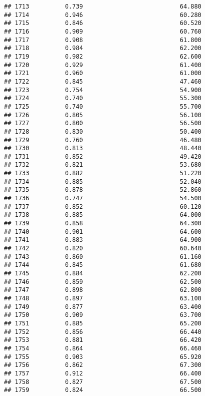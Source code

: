 \documentclass[
]{article}
\begin{document}
\begin{verbatim}
## 1713          0.739                           64.880
## 1714          0.946                           60.280
## 1715          0.846                           60.520
## 1716          0.909                           60.760
## 1717          0.908                           61.800
## 1718          0.984                           62.200
## 1719          0.982                           62.600
## 1720          0.929                           61.400
## 1721          0.960                           61.000
## 1722          0.845                           47.460
## 1723          0.754                           54.900
## 1724          0.740                           55.300
## 1725          0.740                           55.700
## 1726          0.805                           56.100
## 1727          0.800                           56.500
## 1728          0.830                           50.400
## 1729          0.760                           46.480
## 1730          0.813                           48.440
## 1731          0.852                           49.420
## 1732          0.821                           53.680
## 1733          0.882                           51.220
## 1734          0.885                           52.040
## 1735          0.878                           52.860
## 1736          0.747                           54.500
## 1737          0.852                           60.120
## 1738          0.885                           64.000
## 1739          0.858                           64.300
## 1740          0.901                           64.600
## 1741          0.883                           64.900
## 1742          0.820                           60.640
## 1743          0.860                           61.160
## 1744          0.845                           61.680
## 1745          0.884                           62.200
## 1746          0.859                           62.500
## 1747          0.898                           62.800
## 1748          0.897                           63.100
## 1749          0.877                           63.400
## 1750          0.909                           63.700
## 1751          0.885                           65.200
## 1752          0.856                           66.440
## 1753          0.881                           66.420
## 1754          0.864                           66.460
## 1755          0.903                           65.920
## 1756          0.862                           67.300
## 1757          0.912                           66.400
## 1758          0.827                           67.500
## 1759          0.824                           66.500

\end{verbatim}
\end{document}
